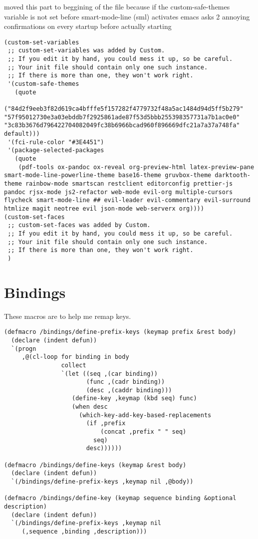 \documentclass[11pt]{article}
\begin{document}
moved this part to beggining of the file because if the
custom-safe-themes variable is not set before smart-mode-line (sml) activates
emacs asks 2 annoying confirmations on every startup before actually starting

\begin{verbatim}
(custom-set-variables
 ;; custom-set-variables was added by Custom.
 ;; If you edit it by hand, you could mess it up, so be careful.
 ;; Your init file should contain only one such instance.
 ;; If there is more than one, they won't work right.
 '(custom-safe-themes
   (quote
    ("84d2f9eeb3f82d619ca4bfffe5f157282f4779732f48a5ac1484d94d5ff5b279" "57f95012730e3a03ebddb7f2925861ade87f53d5bbb255398357731a7b1ac0e0" "3c83b3676d796422704082049fc38b6966bcad960f896669dfc21a7a37a748fa" default)))
 '(fci-rule-color "#3E4451")
 '(package-selected-packages
   (quote
    (pdf-tools ox-pandoc ox-reveal org-preview-html latex-preview-pane smart-mode-line-powerline-theme base16-theme gruvbox-theme darktooth-theme rainbow-mode smartscan restclient editorconfig prettier-js pandoc rjsx-mode js2-refactor web-mode evil-org multiple-cursors flycheck smart-mode-line ## evil-leader evil-commentary evil-surround htmlize magit neotree evil json-mode web-serverx org))))
(custom-set-faces
 ;; custom-set-faces was added by Custom.
 ;; If you edit it by hand, you could mess it up, so be careful.
 ;; Your init file should contain only one such instance.
 ;; If there is more than one, they won't work right.
 )
\end{verbatim}


\section*{Bindings}
\label{sec:orgf725535}


These macros are to help me remap keys.

\begin{verbatim}
(defmacro /bindings/define-prefix-keys (keymap prefix &rest body)
  (declare (indent defun))
  `(progn
     ,@(cl-loop for binding in body
                collect
                `(let ((seq ,(car binding))
                       (func ,(cadr binding))
                       (desc ,(caddr binding)))
                   (define-key ,keymap (kbd seq) func)
                   (when desc
                     (which-key-add-key-based-replacements
                       (if ,prefix
                           (concat ,prefix " " seq)
                         seq)
                       desc))))))

(defmacro /bindings/define-keys (keymap &rest body)
  (declare (indent defun))
  `(/bindings/define-prefix-keys ,keymap nil ,@body))

(defmacro /bindings/define-key (keymap sequence binding &optional description)
  (declare (indent defun))
  `(/bindings/define-prefix-keys ,keymap nil
     (,sequence ,binding ,description)))
\end{verbatim}
\end{document}
